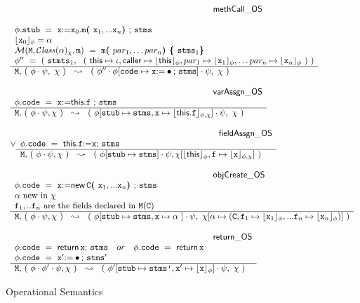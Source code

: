 \begin{figure*}
$\begin{array}{l}
\inferenceruleNN {methCall\_OS} { 
\\
\phi.\prg{stub}\ =\ \x {\kw{:= }} \x_0.\m \lp \x_1, ... \x_n \rp \semi \prg{stms}
\\ 
\interp{\x_0}{\phi} = \alpha 
\\
\Meths {} {\ClassOf {\alpha} {\chi}} {\m} \  =  \ \m\lp par_1, \ldots par_n \rp \lb \prg{stms}_1   \rb
  \\
 \phi''\ =\  (\  \prg{stmts}_1,\ \ (\ \this \mapsto \iota, \caller \mapsto  \interp{\this}{\phi}, par_1 \mapsto  \interp{\x_1}{\phi}, \ldots par_n \mapsto  \interp{\x_n}{\phi}\ ) \ )
}
{
 \M,\, (\ \phi\cdot\psi,\ \chi\ )\ \ \leadsto\  \ (\ \phi''\cdot\phi[\prg{code}\mapsto\x  \kw{:=} \bullet \semi \prg{stms}] \cdot\psi,\ \chi\ ) 
}

\\ \\
\inferenceruleNN {varAssgn\_OS} {
 \phi.\prg{code} \ = \ \x  {\kw{:= }}   \this.\f \ \semi \prg{stms}
}
{
 \M,\,  (\ \phi\cdot\psi, \chi\ )\ \ \leadsto\  \ (\ \phi[ \prg{stub} \mapsto \prg{stms}, \x\mapsto \interp{\this.\f}{\phi,\chi}] \cdot\psi,\ \chi\  )
}
\\
\\\vee
\inferenceruleNN{fieldAssgn\_OS} {
 \phi.\prg{code}\ =\  \this.\f  \kw{:=} \x  \semi \prg{stms}
}
{
 \M,\,  (\ \phi\cdot\psi, \chi\  )\ \ \leadsto\  \ (\ \phi[\prg{stub}\mapsto  \prg{stms} ] \cdot\psi, \chi[\interp{\this}{\phi},\f \mapsto \interp{\x}{\phi,\chi}]\  ) 
}
\\
\\
\inferenceruleNN {objCreate\_OS} {
 \phi.\prg{code}\ =\  \x  \kw{:=} \kw{new }\, \c \lp \x_1, ... \x_n \rp  \semi \prg{stms}
 \\
 \alpha\ \mbox{new in}\ \chi
 \\
\f_1, .. \f_n\ \mbox{are the fields declared in } \M(\c)
}
{
 \M,\,  (\ \phi\cdot\psi, \chi\ )\ \ \leadsto\  \ (\ \phi[\prg{stub}\mapsto  \prg{stms},\x \mapsto \alpha\ ] \cdot\psi, \ \chi[\alpha \mapsto (\c,\f_1 \mapsto \interp{\x_1}{\phi},  ... \f_n \mapsto \interp{\x_n}{\phi}  ) ]\ ) 
}
\\
\\
\inferenceruleNN {return\_OS} {
 \phi.\prg{code}\ =\   {\kw {return }}\, \x  \semi \prg{stms}\ \  \ or\  \ \  \phi.\prg{code}\ =\   {\kw{return}}\, \x 
 \\
\phi.\prg{code}\ =\  \x' \kw{:=} \bullet  \semi \prg{stms}'
}
{
 \M,\,  (\ \phi\cdot\phi'\cdot\psi, \chi\ )\ \ \leadsto\  \ (\ \phi'[\prg{stub}\mapsto  \prg{stms'},\x' \mapsto \interp{\x}{\phi}] \cdot\psi, \ \chi \ ) 
}
\end{array}
$
\caption{Operational Semantics}
\label{fig:Execution}
\end{figure*}



